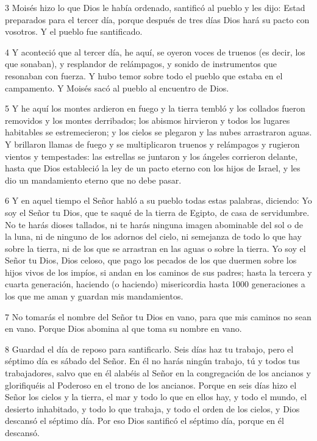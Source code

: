 \par 3 Moisés hizo lo que Dios le había ordenado, santificó al pueblo y les dijo: Estad preparados para el tercer día, porque después de tres días Dios hará su pacto con vosotros. Y el pueblo fue santificado.

\par 4 Y aconteció que al tercer día, he aquí, se oyeron voces de truenos (es decir, los que sonaban), y resplandor de relámpagos, y sonido de instrumentos que resonaban con fuerza. Y hubo temor sobre todo el pueblo que estaba en el campamento. Y Moisés sacó al pueblo al encuentro de Dios.

\par 5 Y he aquí los montes ardieron en fuego y la tierra tembló y los collados fueron removidos y los montes derribados; los abismos hirvieron y todos los lugares habitables se estremecieron; y los cielos se plegaron y las nubes arrastraron aguas. Y brillaron llamas de fuego y se multiplicaron truenos y relámpagos y rugieron vientos y tempestades: las estrellas se juntaron y los ángeles corrieron delante, hasta que Dios estableció la ley de un pacto eterno con los hijos de Israel, y les dio un mandamiento eterno que no debe pasar.

\par 6 Y en aquel tiempo el Señor habló a su pueblo todas estas palabras, diciendo: Yo soy el Señor tu Dios, que te saqué de la tierra de Egipto, de casa de servidumbre. No te harás dioses tallados, ni te harás ninguna imagen abominable del sol o de la luna, ni de ninguno de los adornos del cielo, ni semejanza de todo lo que hay sobre la tierra, ni de los que se arrastran en las aguas o sobre la tierra. Yo soy el Señor tu Dios, Dios celoso, que pago los pecados de los que duermen sobre los hijos vivos de los impíos, si andan en los caminos de sus padres; hasta la tercera y cuarta generación, haciendo (o haciendo) misericordia hasta 1000 generaciones a los que me aman y guardan mis mandamientos.

\par 7 No tomarás el nombre del Señor tu Dios en vano, para que mis caminos no sean en vano. Porque Dios abomina al que toma su nombre en vano.

\par 8 Guardad el día de reposo para santificarlo. Seis días haz tu trabajo, pero el séptimo día es sábado del Señor. En él no harás ningún trabajo, tú y todos tus trabajadores, salvo que en él alabéis al Señor en la congregación de los ancianos y glorifiquéis al Poderoso en el trono de los ancianos. Porque en seis días hizo el Señor los cielos y la tierra, el mar y todo lo que en ellos hay, y todo el mundo, el desierto inhabitado, y todo lo que trabaja, y todo el orden de los cielos, y Dios descansó el séptimo día. Por eso Dios santificó el séptimo día, porque en él descansó.

